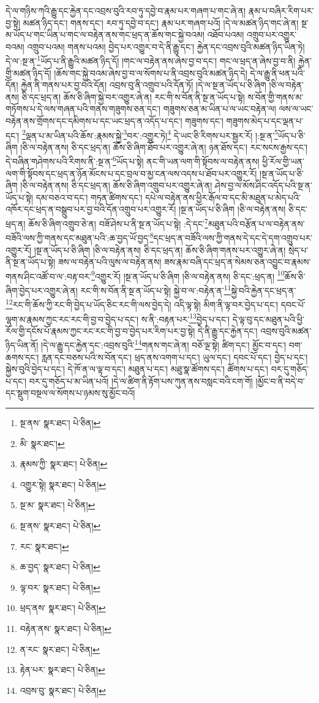དེ་ལ་གཉིས་ཀའི་རྒྱུ་དང་རྐྱེན་དང་འབྲས་བུའི་རབ་ཏུ་དབྱེ་བ་རྣམ་པར་གཞག་པ་གང་ཞེ་ན། རྣམ་པ་བཞིར་རིག་པར་བྱ་སྟེ། མཚན་ཉིད་དང་། གནས་དང་། རབ་ཏུ་དབྱེ་བ་དང་། རྣམ་པར་གཞག་པའོ། །དེ་ལ་མཚན་ཉིད་གང་ཞེ་ན། སྔ་མ་ཡོད་པ་གང་ཡིན་པ་གང་ལ་བརྟེན་ནས་གང་ཕྲད་ན་ཆོས་གང་སྐྱེ་བའམ། འཐོབ་པའམ། འགྲུབ་པར་འགྱུར་བའམ། འགྲུབ་པའམ། གནས་པའམ། བྱེད་པར་འགྱུར་བ་དེ་ནི་རྒྱུ་དང་། རྐྱེན་དང་འབྲས་བུའི་མཚན་ཉིད་ཡིན་ཏེ། དེ་ལ་:སྔ་ན་\footnote{སྔ་ནས་  སྣར་ཐང་།  པེ་ཅིན། }ཡོད་པ་ནི་རྒྱུའི་མཚན་ཉིད་དོ། །གང་ལ་བརྟེན་ནས་ཞེས་བྱ་བ་དང་། གང་ལ་ཕྲད་ན་ཞེས་བྱ་བ་ནི། རྐྱེན་གྱི་མཚན་ཉིད་དོ། །ཆོས་གང་སྐྱེ་བའམ་ཞེས་བྱ་བ་ལ་སོགས་པ་ནི་འབྲས་བུའི་མཚན་ཉིད་དེ། དེ་ལ་རྒྱུ་ནི་ཕན་པའི་དོན། རྐྱེན་ནི་གནས་པར་བྱ་བའི་དོན། འབྲས་བུ་ནི་འགྲུབ་པའི་དོན་ཏོ། །དེ་ལ་སྔ་ན་ཡོད་པ་ཅི་ཞིག །ཅི་ལ་བརྟེན་ནས། ཅི་དང་ཕྲད་ན། ཆོས་ཅི་ཞིག་སྐྱེ་བར་འགྱུར་ཞེ་ན། རང་གི་ས་བོན་ནི་སྔ་ན་ཡོད་པ་སྟེ། ས་བོན་གྱི་གནས་མ་གཏོགས་པ་དེ་ལས་གཞན་པའི་གནས་གཟུགས་ཅན་དང་། གཟུགས་ཅན་མ་ཡིན་པ་ལ་ཡང་བརྟེན་ལ། ལས་ལ་ཡང་བརྟེན་ནས་གྲོགས་དང་དམིགས་པ་དང་ཡང་ཕྲད་ན་འདོད་པ་དང་། གཟུགས་དང་། གཟུགས་མེད་པ་དང་ལྡན་པ་དང་། \footnote{མི་  སྣར་ཐང་། }ལྡན་པ་མ་ཡིན་པའི་ཆོས་:རྣམས་སྐྱེ་\footnote{རྣམས་ཀྱི་  སྣར་ཐང་།  པེ་ཅིན། }བར་:འགྱུར་ཏེ།\footnote{འགྱུར་སྟེ།  སྣར་ཐང་།  པེ་ཅིན། } དེ་ཡང་ཅི་རིགས་པར་སྦྱར་རོ། །:སྔ་ན་\footnote{སྔ་མ་  སྣར་ཐང་།  པེ་ཅིན། }ཡོད་པ་ཅི་ཞིག །ཅི་ལ་བརྟེན་ནས། ཅི་དང་ཕྲད་ན། ཆོས་ཅི་ཞིག་ཐོབ་པར་འགྱུར་ཞེ་ན། ཉན་ཐོས་དང་། རང་སངས་རྒྱས་དང་། དེ་བཞིན་གཤེགས་པའི་རིགས་ནི་:སྔ་ན་\footnote{སྔ་ནས་  སྣར་ཐང་།  པེ་ཅིན། }ཡོད་པ་སྟེ། ནང་གི་ཡན་ལག་གི་སྟོབས་ལ་བརྟེན་ནས། ཕྱི་རོལ་གྱི་ཡན་ལག་གི་སྟོབས་དང་ཕྲད་ན་ཉོན་མོངས་པ་དང་བྲལ་བ་མྱ་ངན་ལས་འདས་པ་ཐོབ་པར་འགྱུར་རོ། །སྔ་ན་ཡོད་པ་ཅི་ཞིག །ཅི་ལ་བརྟེན་ནས། ཅི་དང་ཕྲད་ན། ཆོས་ཅི་ཞིག་འགྲུབ་པར་འགྱུར་ཞེ་ན། ཤེས་བྱ་ལ་མོས་ཤིང་འདོད་པའི་སྔ་ན་ཡོད་པ་སྟེ། དམ་བཅའ་བ་དང་། གཏན་ཚིགས་དང་། དཔེ་ལ་བརྟེན་ནས་ཕྱིར་རྒོལ་བ་དང་མི་མཐུན་པ་མེད་པའི་འཁོར་དང་ཕྲད་ན་བསྒྲུབ་པར་བྱ་བའི་དོན་འགྲུབ་པར་འགྱུར་རོ། །སྔ་ན་ཡོད་པ་ཅི་ཞིག །ཅི་ལ་བརྟེན་ནས། ཅི་དང་ཕྲད་ན། ཆོས་ཅི་ཞིག་འགྲུབ་ཅེ་ན། བཟོ་ཤེས་པ་ནི་སྔ་ན་ཡོད་པ་སྟེ། :དེ་དང་\footnote{རང་  སྣར་ཐང་། }མཐུན་པའི་བརྩོན་པ་ལ་བརྟེན་ནས་བཟོའི་ལས་ཀྱི་གནས་དང་མཐུན་པའི་:ཆ་བྱད་ཡོ་བྱད་\footnote{ཆ་བྱད་  སྣར་ཐང་།  པེ་ཅིན། }དང་ཕྲད་ན་བཟོའི་ལས་ཀྱི་གནས་དེ་དང་དེ་དག་འགྲུབ་པར་འགྱུར་རོ། །སྔ་ན་ཡོད་པ་ཅི་ཞིག །ཅི་ལ་བརྟེན་ནས། ཅི་དང་ཕྲད་ན། ཆོས་ཅི་ཞིག་གནས་པར་འགྱུར་ཞེ་ན། སྲེད་པ་ནི་སྔ་ན་ཡོད་པ་སྟེ། ཟས་ལ་བརྟེན་པའི་ལུས་ལ་བརྟེན་ནས། ཟས་རྣམ་བཞི་དང་ཕྲད་ན་སེམས་ཅན་འབྱུང་བ་རྣམས་གནས་ཤིང་འཚོ་བ་ལ་:བརྟ་བར་\footnote{ལྟ་བར་  སྣར་ཐང་།  པེ་ཅིན། }འགྱུར་རོ། །སྔ་ན་ཡོད་པ་ཅི་ཞིག །ཅི་ལ་བརྟེན་ནས། ཅི་དང་:ཕྲད་ན། \footnote{ཕྲད་ནས་  སྣར་ཐང་།  པེ་ཅིན། }ཆོས་ཅི་ཞིག་བྱེད་པར་འགྱུར་ཞེ་ན། རང་གི་ས་བོན་ནི་སྔ་ན་ཡོད་པ་སྟེ། སྐྱེ་བ་ལ་:བརྟེན་ན་\footnote{བརྟེན་ནས་  སྣར་ཐང་།  པེ་ཅིན། }སྐྱེ་བའི་རྐྱེན་དང་ཕྲད་ན་\footnote{ན་རང་  སྣར་ཐང་།  པེ་ཅིན། }རང་གི་ཆོས་ཀྱི་རང་གི་བྱེད་པ་ཡོད་ཅིང་རང་གི་ལས་བྱེད་དེ། འདི་ལྟ་སྟེ། མིག་ནི་ལྟ་བར་བྱེད་པ་དང་། དབང་པོ་ལྷག་མ་རྣམས་ཀྱང་རང་རང་གི་བྱ་བ་བྱེད་པ་དང་། ས་ནི་:བརྟན་པར་\footnote{རྟེན་པར་  སྣར་ཐང་།  པེ་ཅིན། }བྱེད་པ་དང་། དེ་ལྟ་བུ་དང་མཐུན་པའི་ཕྱི་རོལ་གྱི་དངོས་པོ་རྣམས་ཀྱང་རང་རང་གི་བྱ་བ་བྱེད་པར་རིག་པར་བྱ་སྟེ། དེ་ནི་རྒྱུ་དང་རྐྱེན་དང་། འབྲས་བུའི་མཚན་ཉིད་ཡིན་ནོ། །དེ་ལ་རྒྱུ་དང་རྐྱེན་དང་:འབྲས་བུའི་\footnote{འབྲས་བུ་  སྣར་ཐང་།  པེ་ཅིན། }གནས་གང་ཞེ་ན། བཅོ་ལྔ་སྟེ། ཚིག་དང་། མྱོང་བ་དང་། བག་ཆགས་དང་། རླན་དང་བཅས་པའི་ས་བོན་དང་། ཕྲད་ནས་འགག་པ་དང་། ཡུལ་དང་། དབང་པོ་དང་། བྱེད་པ་དང་། སྐྱེས་བུའི་བྱེད་པ་དང་། དེ་ཁོ་ན་ལ་ལྟ་བ་དང་། མཐུན་པ་དང་། མཐུ་སྣ་ཚོགས་དང་། ཚོགས་པ་དང་། བར་དུ་གཅོད་པ་དང་། བར་དུ་གཅོད་པ་མ་ཡིན་པའོ། །དེ་ལ་ཚིག་ནི་རྟོག་པས་ཀུན་ནས་བསླང་བའི་ངག་གོ། །མྱོང་བ་ནི་བདེ་བ་དང་སྡུག་བསྔལ་ལ་སོགས་པ་ཉམས་སུ་མྱོང་བའོ། 
